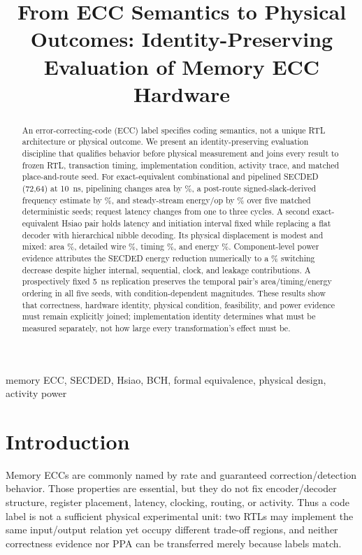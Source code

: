 \documentclass[conference,10pt]{IEEEtran}
\title{From ECC Semantics to Physical Outcomes: Identity-Preserving Evaluation of Memory ECC Hardware}
\author{\IEEEauthorblockN{Anonymous submission}}
\begin{document}
\maketitle

\begin{abstract}
An error-correcting-code (ECC) label specifies coding semantics, not a unique RTL architecture or physical outcome. We present an identity-preserving evaluation discipline that qualifies behavior before physical measurement and joins every result to frozen RTL, transaction timing, implementation condition, activity trace, and matched place-and-route seed. For exact-equivalent combinational and pipelined SECDED (72,64) at 10~ns, pipelining changes area by \SecAreaMean\%, a post-route signed-slack-derived frequency estimate by \SecFreqMean\%, and steady-stream energy/op by \SecEnergyMean\% over five matched deterministic seeds; request latency changes from one to three cycles. A second exact-equivalent Hsiao pair holds latency and initiation interval fixed while replacing a flat decoder with hierarchical nibble decoding. Its physical displacement is modest and mixed: area \HsAreaMean\%, detailed wire \HsWireMean\%, timing \HsFreqMean\%, and energy \HsEnergyMean\%. Component-level power evidence attributes the SECDED energy reduction numerically to a \PowerSwitchingEffect\% switching decrease despite higher internal, sequential, clock, and leakage contributions. A prospectively fixed 5~ns replication preserves the temporal pair's area/timing/energy ordering in all five seeds, with condition-dependent magnitudes. These results show that correctness, hardware identity, physical condition, feasibility, and power evidence must remain explicitly joined; implementation identity determines what must be measured separately, not how large every transformation's effect must be.
\end{abstract}

\begin{IEEEkeywords}
memory ECC, SECDED, Hsiao, BCH, formal equivalence, physical design, activity power
\end{IEEEkeywords}

\section{Introduction}

Memory ECCs are commonly named by rate and guaranteed correction/detection behavior. Those properties are essential, but they do not fix encoder/decoder structure, register placement, latency, clocking, routing, or activity. Thus a code label is not a sufficient physical experimental unit: two RTLs may implement the same input/output relation yet occupy different trade-off regions, and neither correctness evidence nor PPA can be transferred merely because labels match.
\end{document}
